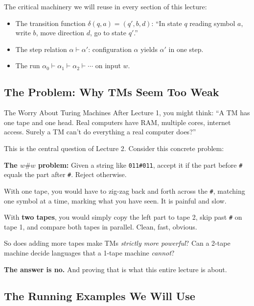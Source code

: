 \documentclass[11pt,a4paper]{article}
\begin{document}
The critical machinery we will reuse in every section of this lecture:
\begin{itemize}[nosep]
\item The transition function $\delta(q, a) = (q', b, d)$: ``In state $q$ reading symbol $a$, write $b$, move direction $d$, go to state $q'$.''
\item The step relation $\alpha \vdash \alpha'$: configuration $\alpha$ yields $\alpha'$ in one step.
\item The run $\alpha_0 \vdash \alpha_1 \vdash \alpha_2 \vdash \cdots$ on input $w$.
\end{itemize}

\subsection{The Problem: Why TMs Seem Too Weak}

\begin{conceptbox}{The Worry About Turing Machines}
After Lecture 1, you might think: ``A TM has one tape and one head. Real computers have RAM, multiple cores, internet access. Surely a TM can't do everything a real computer does?''

This is the central question of Lecture 2. Consider this concrete problem:

\textbf{The $w\#w$ problem:} Given a string like \texttt{011\#011}, accept it if the part before \texttt{\#} equals the part after \texttt{\#}. Reject otherwise.

With one tape, you would have to zig-zag back and forth across the \texttt{\#}, matching one symbol at a time, marking what you have seen. It is painful and slow.

With \textbf{two tapes}, you would simply copy the left part to tape 2, skip past \texttt{\#} on tape 1, and compare both tapes in parallel. Clean, fast, obvious.

So does adding more tapes make TMs \textit{strictly more powerful}? Can a 2-tape machine decide languages that a 1-tape machine \textit{cannot}?

\textbf{The answer is no.} And proving that is what this entire lecture is about.
\end{conceptbox}

\subsection{The Running Examples We Will Use}
\end{document}
